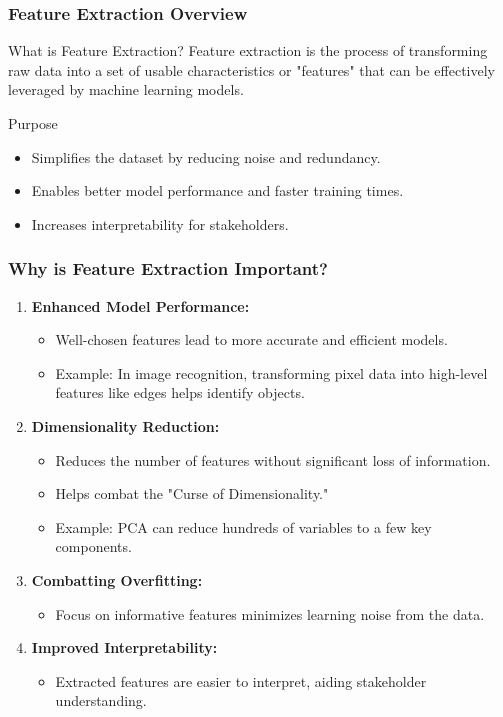 \documentclass[aspectratio=169]{beamer}
\begin{document}
\begin{frame}[fragile]
    \frametitle{Feature Extraction Overview}
    \begin{block}{What is Feature Extraction?}
        Feature extraction is the process of transforming raw data into a set of usable characteristics or "features" that can be effectively leveraged by machine learning models. 
    \end{block}
    \begin{block}{Purpose}
        \begin{itemize}
            \item Simplifies the dataset by reducing noise and redundancy.
            \item Enables better model performance and faster training times.
            \item Increases interpretability for stakeholders.
        \end{itemize}
    \end{block}
\end{frame}

\begin{frame}[fragile]
    \frametitle{Why is Feature Extraction Important?}
    \begin{enumerate}
        \item \textbf{Enhanced Model Performance:}
        \begin{itemize}
            \item Well-chosen features lead to more accurate and efficient models.
            \item Example: In image recognition, transforming pixel data into high-level features like edges helps identify objects.
        \end{itemize}
        
        \item \textbf{Dimensionality Reduction:}
        \begin{itemize}
            \item Reduces the number of features without significant loss of information.
            \item Helps combat the "Curse of Dimensionality."
            \item Example: PCA can reduce hundreds of variables to a few key components.
        \end{itemize}
        
        \item \textbf{Combatting Overfitting:}
        \begin{itemize}
            \item Focus on informative features minimizes learning noise from the data.
        \end{itemize}
        
        \item \textbf{Improved Interpretability:}
        \begin{itemize}
            \item Extracted features are easier to interpret, aiding stakeholder understanding.
        \end{itemize}
    \end{enumerate}
\end{frame}
\end{document}
